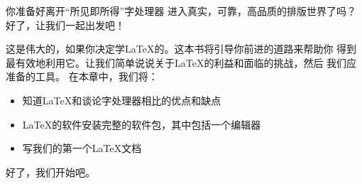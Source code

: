 你准备好离开“所见即所得”字处理器
进入真实，可靠，高品质的排版世界了吗？
好了，让我们一起出发吧！

这是伟大的，如果你决定学LaTeX的。这本书将引导你前进的道路来帮助你
得到最有效地利用它。让我们简单说说关于LaTeX的利益和面临的挑战，然后
我们应准备的工具。
在本章中，我们将：
\begin{itemize}
	\item {知道LaTeX和谈论字处理器相比的优点和缺点}
	\item {LaTeX的软件安装完整的软件包，其中包括一个编辑器}
	\item {写我们的第一个LaTeX文档}
\end{itemize}
好了，我们开始吧。
